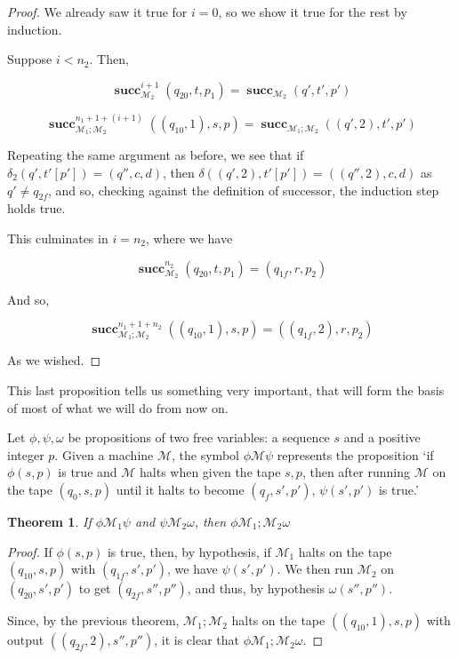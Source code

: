 \documentclass{article}
\newtheorem{theorem}{Theorem}
\newcommand{\M}{\mathcal{M}}
\DeclareMathOperator{\suc}{\mathbf{succ}}
\begin{document}
\begin{proof}
	We already saw it true for $i=0$, so we show it true for the rest by induction.
	
	Suppose $i < n_2$. Then,
	
	\[\suc^{i+1}_{\M_2} (q_{20}, t, p_1) = \suc_{\M_2} (q', t', p')\]
	
	\[\suc^{n_1+1+(i+1)}_{\M_1;\M_2} ((q_{10}, 1), s, p) = \suc_{\M_1;\M_2} ((q', 2), t', p')\]
	
	Repeating the same argument as before, we see that if $\delta_2(q', t'[p']) = (q'', c, d)$, then $\delta((q',2), t'[p']) = ((q'', 2), c, d)$ as $q' \neq q_{2f}$, and so, checking against the definition of successor, the induction step holds true.
	
	This culminates in $i = n_2$, where we have
	
	\[\suc^{n_2}_{\M_2} (q_{20}, t, p_1) = (q_{1f}, r, p_2)\]
	
	And so,
	
	\[\suc^{n_1 + 1 + n_2}_{\M_1;\M_2} ((q_{10},1), s, p) = ((q_{1f},2), r, p_2)\]
	
	As we wished.
	\end{proof}
	
	This last proposition tells us something very important, that will form the basis of most of what we will do from now on.
	
	Let $\phi, \psi, \omega$ be propositions of two free variables: a sequence $s$ and a positive integer $p$. Given a machine $\M$, the symbol $\phi\M\psi$ represents the proposition `if $\phi(s,p)$ is true and $\M$ halts when given the tape $s, p$, then after running $\M$ on the tape $(q_0, s, p)$ until it halts to become $(q_f, s', p')$, $\psi(s', p')$ is true.'
	
	
	\begin{theorem}
	If $\phi \M_1 \psi$ and $\psi \M_2 \omega$, then $\phi \M_1;\M_2 \omega$
	\end{theorem}
	
	\begin{proof}
	
	If $\phi(s,p)$ is true, then, by hypothesis, if $\M_1$ halts on the tape $(q_{10}, s, p)$ with $(q_{1f}, s', p')$, we have $\psi(s', p')$. We then run $\M_2$ on $(q_{20}, s', p')$ to get $(q_{2f}, s'', p'')$, and thus, by hypothesis $\omega(s'', p'')$.
	
	Since, by the previous theorem, $\M_1;\M_2$ halts on the tape $((q_{10}, 1),s,p)$ with output $((q_{2f}, 2), s'', p'')$, it is clear that $\phi \M_1;\M_2 \omega$.
	
	\end{proof}
	
\end{document}

